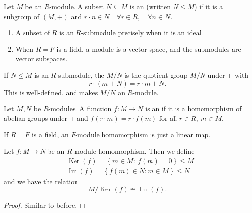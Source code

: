 \documentclass[egregdoesnotlikesansseriftitles,a4paper]{scrartcl}
\begin{document}
\begin{definition*}[Submodule]
       Let $M$ be an $R$-module. A subset $N \subseteq M$ is an  (written $N \leq M$) if it is a subgroup of $(M,+)$ and $r \cdot n \in N \quad \forall r \in R, \quad \forall n \in N$.
       \begin{example*}
            \begin{enumerate}
                  \item A subset of $R$ is an $R$-submodule precisely when it is an ideal. 
                  \item When $R=F$ is a field, a module is a vector space, and the submodules are vector subspaces.
            \end{enumerate}
     \end{example*}
\end{definition*}
\begin{definition*}
       If $N \leq M$ is an $R$-submodule, the  $M/N$ is the quotient group $M/N$ under + with \[
       r \cdot (m+N)= r \cdot m+N
       .\] This is well-defined, and makes $M/N$ an $R$-module.
\end{definition*}
\begin{definition*}[Homomorphism]
       Let $M,N$ be $R$-modules. A function $f: M \rightarrow N$ is an  if it is a homomorphism of abelian groups under + and $f (r \cdot m)=r \cdot f (m)$ for all $r \in R, \ m \in M$.
       \begin{example*}
              If $R=F$ is a field, an $F$-module homomorphism is just a linear map.
       \end{example*}
\end{definition*}
\begin{theorem}
       Let $f: M \rightarrow N$ be an $R$-module homomorphism. Then we define
       \begin{align*}
             &\operatorname{Ker}(f)=\left\{m \in M: \ f (m)=0\right\}\leq M\\
             &\operatorname{Im}(f)= \left\{f (m)\in N: m \in M\right\} \leq N
       \end{align*}
       and we have the relation \[
       M/\operatorname{Ker}(f) \cong \operatorname{Im}(f)
       .\] 
       \begin{proof}
              Similar to before.
       \end{proof}
\end{theorem}
\end{document}
